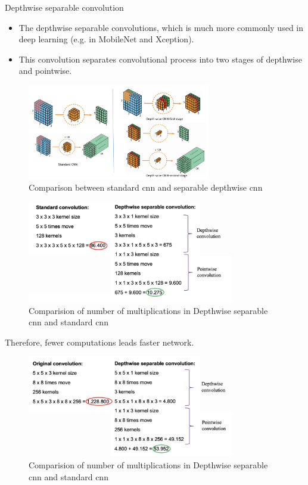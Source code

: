 \begin{vbframe}{Depthwise separable convolution}
   \begin{itemize}
     \item The depthwise separable convolutions, which is much more commonly used in deep learning (e.g. in MobileNet and Xception).
     \item This convolution separates convolutional process into two stages of depthwise and pointwise.
   \end{itemize}

 
\begin{figure}
\centering
\includegraphics[width=8cm]{plots/05_conv_variations/separable/Depthwise.png}
\caption{Comparison between standard cnn and separable depthwise cnn}
\end{figure}
     
     
\begin{figure}
\centering
\includegraphics[width=9cm]{plots/05_conv_variations/separable/example-depthwise2.png}
\caption{Comparision of number of multiplications in Depthwise separable cnn and standard cnn}
\end{figure}
     
Therefore, fewer computations leads faster network.
     
\begin{figure}
\centering
\includegraphics[width=9cm]{plots/05_conv_variations/separable/example-depthwise1.png}
\caption{Comparision of number of multiplications in Depthwise separable cnn and standard cnn}
\end{figure}
     
\end{vbframe}


